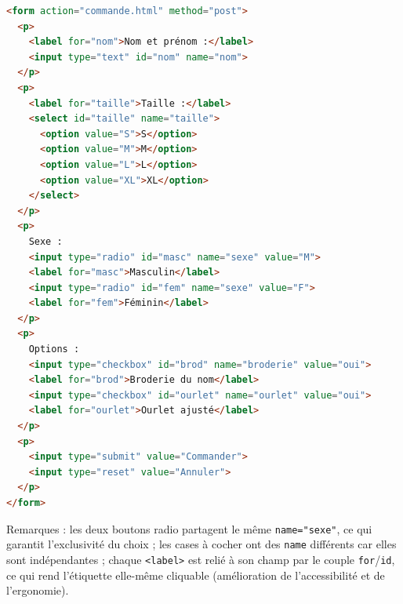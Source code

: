 \documentclass[11pt]{article}
\begin{document}
\begin{corrige}
\begin{lstlisting}[language=HTML]
<form action="commande.html" method="post">
  <p>
    <label for="nom">Nom et prénom :</label>
    <input type="text" id="nom" name="nom">
  </p>
  <p>
    <label for="taille">Taille :</label>
    <select id="taille" name="taille">
      <option value="S">S</option>
      <option value="M">M</option>
      <option value="L">L</option>
      <option value="XL">XL</option>
    </select>
  </p>
  <p>
    Sexe :
    <input type="radio" id="masc" name="sexe" value="M">
    <label for="masc">Masculin</label>
    <input type="radio" id="fem" name="sexe" value="F">
    <label for="fem">Féminin</label>
  </p>
  <p>
    Options :
    <input type="checkbox" id="brod" name="broderie" value="oui">
    <label for="brod">Broderie du nom</label>
    <input type="checkbox" id="ourlet" name="ourlet" value="oui">
    <label for="ourlet">Ourlet ajusté</label>
  </p>
  <p>
    <input type="submit" value="Commander">
    <input type="reset" value="Annuler">
  </p>
</form>
\end{lstlisting}
Remarques : les deux boutons radio partagent le même \texttt{name="sexe"}, ce qui garantit l'exclusivité du choix ; les cases à cocher ont des \texttt{name} différents car elles sont indépendantes ; chaque \texttt{<label>} est relié à son champ par le couple \texttt{for}/\texttt{id}, ce qui rend l'étiquette elle-même cliquable (amélioration de l'accessibilité et de l'ergonomie).
\end{corrige}
\end{document}
